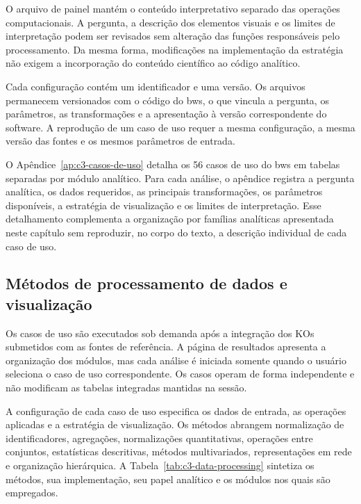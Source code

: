 O arquivo de painel mantém o conteúdo interpretativo separado das operações
computacionais. A pergunta, a descrição dos elementos visuais e os limites de
interpretação podem ser revisados sem alteração das funções responsáveis pelo
processamento. Da mesma forma, modificações na implementação da estratégia não
exigem a incorporação do conteúdo científico ao código analítico.

Cada configuração contém um identificador e uma versão. Os arquivos permanecem
versionados com o código do \gls{bws}, o que vincula a pergunta, os parâmetros,
as transformações e a apresentação à versão correspondente do software. A
reprodução de um caso de uso requer a mesma configuração, a mesma versão das
fontes e os mesmos parâmetros de entrada.

O Apêndice~\ref{ap:c3-casos-de-uso} detalha os 56 casos de uso do
\gls{bws} em tabelas separadas por módulo analítico. Para cada análise, o
apêndice registra a pergunta analítica, os dados requeridos, as principais
transformações, os parâmetros disponíveis, a estratégia de visualização e os
limites de interpretação. Esse detalhamento complementa a organização por
famílias analíticas apresentada neste capítulo sem reproduzir, no corpo do
texto, a descrição individual de cada caso de uso.

\subsection{Métodos de processamento de dados e visualização}

Os casos de uso são executados sob demanda após a integração dos KOs
submetidos com as fontes de referência. A página de resultados apresenta a
organização dos módulos, mas cada análise é iniciada somente quando o usuário
seleciona o caso de uso correspondente. Os casos operam de forma independente
e não modificam as tabelas integradas mantidas na sessão.

A configuração de cada caso de uso especifica os dados de entrada, as
operações aplicadas e a estratégia de visualização. Os métodos abrangem
normalização de identificadores, agregações, normalizações quantitativas,
operações entre conjuntos, estatísticas descritivas, métodos multivariados,
representações em rede e organização hierárquica. A
Tabela~\ref{tab:c3-data-processing} sintetiza os métodos, sua implementação,
seu papel analítico e os módulos nos quais são empregados.

